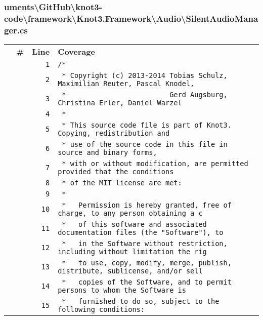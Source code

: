 \documentclass[a4paper,10pt]{article}
\begin{document}
\subsubsection{uments\textbackslash GitHub\textbackslash knot3-code\textbackslash framework\textbackslash Knot3.Framework\textbackslash Audio\textbackslash SilentAudioManager.cs}
\begin{longtable}[l]{lrrl}
\textbf{} & \textbf{\#} & \textbf{Line} & \textbf{Coverage}\\
\cellcolor{gray} &  & \verb~1~ & \verb~/*~\\
\cellcolor{gray} &  & \verb~2~ & \verb~ * Copyright (c) 2013-2014 Tobias Schulz, Maximilian Reuter, Pascal Knodel,~\\
\cellcolor{gray} &  & \verb~3~ & \verb~ *                         Gerd Augsburg, Christina Erler, Daniel Warzel~\\
\cellcolor{gray} &  & \verb~4~ & \verb~ *~\\
\cellcolor{gray} &  & \verb~5~ & \verb~ * This source code file is part of Knot3. Copying, redistribution and~\\
\cellcolor{gray} &  & \verb~6~ & \verb~ * use of the source code in this file in source and binary forms,~\\
\cellcolor{gray} &  & \verb~7~ & \verb~ * with or without modification, are permitted provided that the conditions~\\
\cellcolor{gray} &  & \verb~8~ & \verb~ * of the MIT license are met:~\\
\cellcolor{gray} &  & \verb~9~ & \verb~ *~\\
\cellcolor{gray} &  & \verb~10~ & \verb~ *   Permission is hereby granted, free of charge, to any person obtaining a c~\\
\cellcolor{gray} &  & \verb~11~ & \verb~ *   of this software and associated documentation files (the "Software"), to ~\\
\cellcolor{gray} &  & \verb~12~ & \verb~ *   in the Software without restriction, including without limitation the rig~\\
\cellcolor{gray} &  & \verb~13~ & \verb~ *   to use, copy, modify, merge, publish, distribute, sublicense, and/or sell~\\
\cellcolor{gray} &  & \verb~14~ & \verb~ *   copies of the Software, and to permit persons to whom the Software is~\\
\cellcolor{gray} &  & \verb~15~ & \verb~ *   furnished to do so, subject to the following conditions:~\\

\end{longtable}
\end{document}
